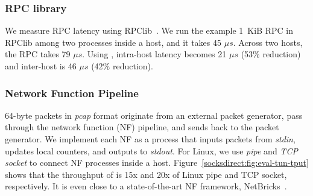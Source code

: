




\subsubsection{RPC library}
\quad

We measure RPC latency using RPClib~\cite{rpclib}.
We run the example 1~KiB RPC in RPClib among two processes inside a host, and it takes 45 $\mu s$. Across two hosts, the RPC takes 79 $\mu s$.
Using \sys{}, intra-host latency becomes 21 $\mu s$ (53\% reduction) and inter-host is 46 $\mu s$ (42\% reduction).


\subsubsection{Network Function Pipeline}
\quad

64-byte packets in \emph{pcap} format originate from an external packet generator, pass through the network function (NF) pipeline, and sends back to the packet generator.
We implement each NF as a process that inputs packets from \emph{stdin}, updates local counters, and outputs to \emph{stdout}.
For Linux, we use \emph{pipe} and \emph{TCP socket} to connect NF processes inside a host.
Figure~\ref{socksdirect:fig:eval-tun-tput} shows that the throughput of \sys{} is 15x and 20x of Linux pipe and TCP socket, respectively.
It is even close to a state-of-the-art NF framework, NetBricks~\cite{panda2016netbricks}.



